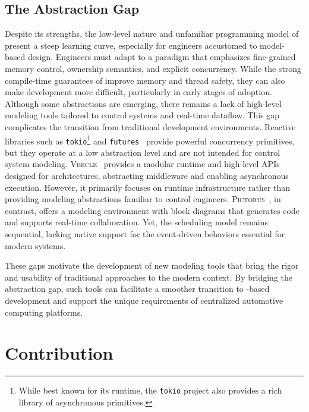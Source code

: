 \subsection{The Abstraction Gap}
\label{sec:intro:gap:abstraction}

Despite its strengths, the low-level nature and unfamiliar programming model of \Rust present a
steep learning curve, especially for engineers accustomed to model-based design. Engineers must
adapt to a paradigm that emphasizes fine-grained memory control, ownership semantics, and explicit
concurrency. While the strong compile-time guarantees of \Rust improve memory and thread safety,
they can also make development more difficult, particularly in early stages of adoption. Although
some abstractions are emerging, there remains a lack of high-level modeling tools tailored to
control systems and real-time dataflow. This gap complicates the transition from traditional
development environments.
%
Reactive \Rust libraries such as \texttt{tokio}\footnote{While best known for its runtime,
    the \texttt{tokio} project also provides a rich library of asynchronous primitives.} and
\texttt{futures}~\cite{tokio,futures} provide powerful concurrency primitives, but they operate at a
low abstraction level and are not intended for control system modeling.
%
\textsc{Veecle}~\cite{veecle} provides a modular runtime and high-level \textsc{API}s designed for
\sdv architectures, abstracting middleware and enabling asynchronous execution.
However, it primarily focuses on runtime infrastructure rather than providing modeling abstractions
familiar to control engineers.
%
\textsc{Pictorus}~\cite{pictorus}, in contrast, offers a modeling environment with block diagrams
that generates \Rust code and supports real-time collaboration. Yet, the scheduling model
remains sequential, lacking native support for the event-driven behaviors essential for
modern \sdv systems.

These gaps motivate the development of new modeling tools that bring the rigor and usability of
traditional approaches to the modern \sdv context. By bridging the abstraction gap, such tools can
facilitate a smoother transition to \Rust-based development and support the unique requirements of
centralized automotive computing platforms.

\section{Contribution}
\label{sec:intro:contrib}

